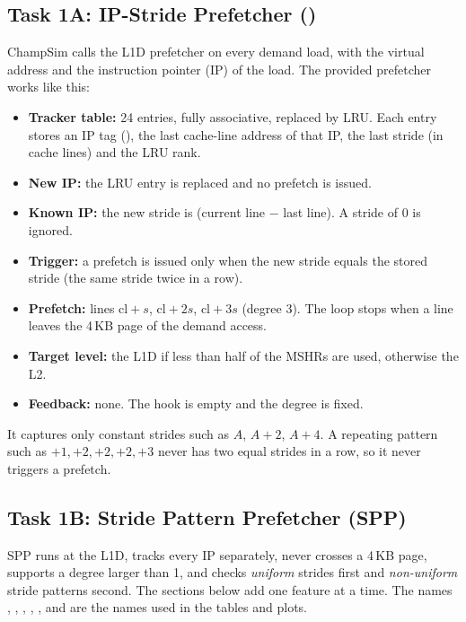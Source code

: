 \subsection{Task 1A: IP-Stride Prefetcher ()}
ChampSim calls the L1D prefetcher on every demand load, with the virtual address and the instruction
pointer (IP) of the load. The provided  prefetcher works like this:
\begin{itemize}
  \item \textbf{Tracker table:} 24 entries, fully associative, replaced by LRU. Each entry stores an IP tag
        (), the last cache-line address of that IP, the last stride (in cache lines) and the LRU rank.
  \item \textbf{New IP:} the LRU entry is replaced and no prefetch is issued.
  \item \textbf{Known IP:} the new stride is (current line $-$ last line). A stride of 0 is ignored.
  \item \textbf{Trigger:} a prefetch is issued only when the new stride equals the stored stride (the same stride twice in a row).
  \item \textbf{Prefetch:} lines $\mathrm{cl}+s$, $\mathrm{cl}+2s$, $\mathrm{cl}+3s$ (degree 3). The loop stops when a line
        leaves the 4\,KB page of the demand access.
  \item \textbf{Target level:} the L1D if less than half of the MSHRs are used, otherwise the L2.
  \item \textbf{Feedback:} none. The  hook is empty and the degree is fixed.
\end{itemize}
It captures only constant strides such as $A$, $A{+}2$, $A{+}4$. A repeating pattern such as
$+1, +2, +2, +2, +3$ never has two equal strides in a row, so it never triggers a prefetch.

\subsection{Task 1B: Stride Pattern Prefetcher (SPP)}
SPP runs at the L1D, tracks every IP separately, never crosses a 4\,KB page, supports a degree larger than 1,
and checks \emph{uniform} strides first and \emph{non-uniform} stride patterns second. The sections below add one
feature at a time. The names , , , , , 
and  are the names used in the tables and plots.

